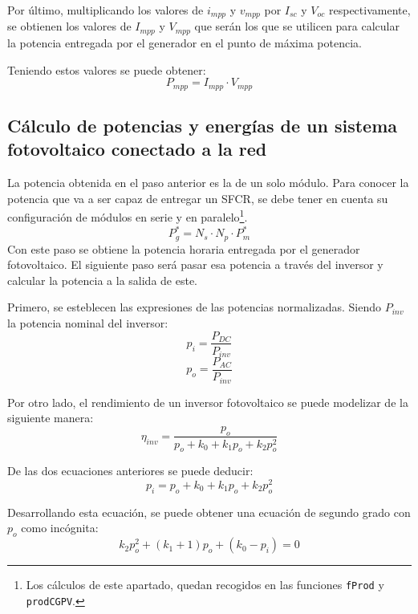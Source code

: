 Por último, multiplicando los valores de \(i_{mpp}\) y \(v_{mpp}\) por \(I_{sc}\) y \(V_{oc}\) respectivamente, se obtienen los valores de \(I_{mpp}\) y \(V_{mpp}\) que serán los que se utilicen para calcular la potencia entregada por el generador en el punto de máxima potencia.

Teniendo estos valores se puede obtener:
\begin{equation}
P_{mpp}=I_{mpp}\cdot V_{mpp}
\end{equation}

\subsection{Cálculo de potencias y energías de un sistema fotovoltaico conectado a la red}
\label{sec:orgf25c569}
\label{subsec:calculo-potencias-energias}
La potencia obtenida en el paso anterior es la de un solo módulo. Para conocer la potencia que va a ser capaz de entregar un SFCR, se debe tener en cuenta su configuración de módulos en serie y en paralelo\footnote{Los cálculos de este apartado, quedan recogidos en las funciones \texttt{fProd} y \texttt{prodCGPV}.}.
\begin{equation}
P_g^*=N_s\cdot N_p\cdot P_m^*
\end{equation}
Con este paso se obtiene la potencia horaria entregada por el generador fotovoltaico. El siguiente paso será pasar esa potencia a través del inversor y calcular la potencia a la salida de este.

Primero, se esteblecen las expresiones de las potencias normalizadas. Siendo \(P_{inv}\) la potencia nominal del inversor:
\begin{equation}
p_i=\frac{P_{DC}}{P_{inv}}
\end{equation}
\begin{equation}
p_o=\frac{P_{AC}}{P_{inv}}
\end{equation}

Por otro lado, el rendimiento de un inversor fotovoltaico se puede modelizar de la siguiente manera:
\begin{equation}
\eta_{inv}=\frac{p_o}{p_o+k_0+k_1p_o+k_2p_o^2}
\end{equation}

De las dos ecuaciones anteriores se puede deducir:
\begin{equation}
p_i=p_o+k_0+k_1p_o+k_2p_o^2
\end{equation}

Desarrollando esta ecuación, se puede obtener una ecuación de segundo grado con \(p_o\) como incógnita:
\begin{equation}
k_2p_o^2+(k_1+1)p_o+(k_0-p_i)=0
\end{equation}

